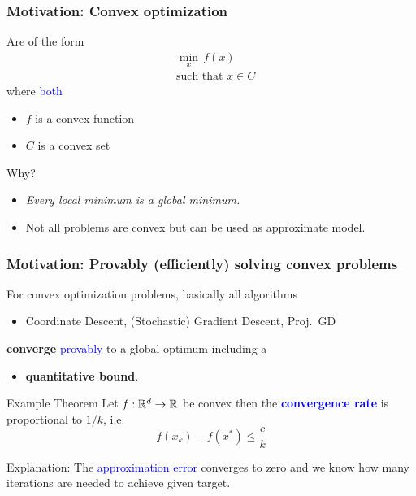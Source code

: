 \documentclass{beamer}
\begin{document}
\begin{frame}
  \frametitle{Motivation: Convex optimization}
  Are of the form
  \begin{equation}
    \begin{aligned}
      &\min_x \, f(x) \\
      &\text{such that $x\in C$}
    \end{aligned}
  \end{equation}
  where \textcolor{blue}{both}
  \begin{itemize}
    \item $f$ is a convex function
    \item $C$ is a convex set
  \end{itemize}
  Why?
  \begin{itemize}
    \item \textit{Every local minimum is a global minimum.}
    \item Not all problems are convex but can be used as approximate model.
  \end{itemize}

\end{frame}


\begin{frame}
  \frametitle{Motivation: Provably (efficiently) solving convex problems}
  For convex optimization problems, basically all algorithms
  \begin{itemize}
    \item Coordinate Descent, (Stochastic) Gradient Descent, Proj.\ GD
  \end{itemize}
  \textbf{converge} \textcolor{blue}{provably} to a global optimum including a
  \begin{itemize}
    \item \textbf{quantitative bound}.
  \end{itemize}

  \begin{block}{ Example Theorem }
    Let $f: \mathbb{R}^d \to \mathbb{R}$ be convex then the \textbf{\textcolor{blue}{convergence rate}} is proportional to $1/k$, i.e.\
    \begin{equation}
      f(x_k) - f(x^*) \le \frac{c}{k}
    \end{equation}
  \end{block}
  Explanation: The \textcolor{blue}{approximation error} converges to zero and we know how many iterations are needed to achieve given target.
\end{frame}
\end{document}
